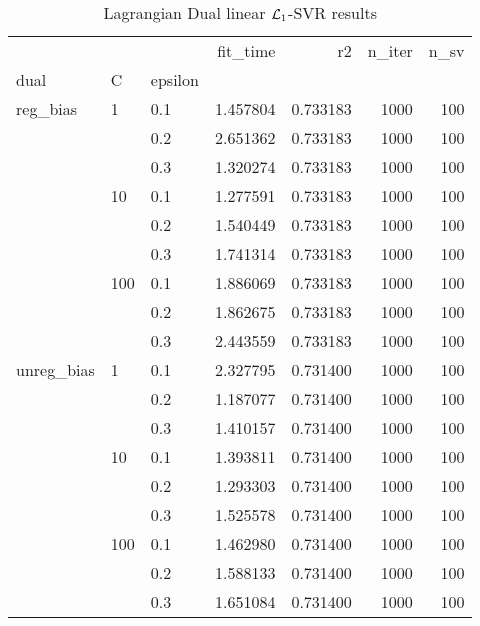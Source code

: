 \begin{table}[H]
\centering
\caption{Lagrangian Dual linear $\protect \mathcal{L}_1$-SVR results}
\label{linear_lagrangian_dual_l1_svr_cv_results}
\begin{tabular}{lllrrrr}
\toprule
           &     &     &  fit\_time &        r2 &  n\_iter &  n\_sv \\
dual & C & epsilon &           &           &         &       \\
\midrule
reg\_bias & 1   & 0.1 &  1.457804 &  0.733183 &    1000 &   100 \\
           &     & 0.2 &  2.651362 &  0.733183 &    1000 &   100 \\
           &     & 0.3 &  1.320274 &  0.733183 &    1000 &   100 \\
           & 10  & 0.1 &  1.277591 &  0.733183 &    1000 &   100 \\
           &     & 0.2 &  1.540449 &  0.733183 &    1000 &   100 \\
           &     & 0.3 &  1.741314 &  0.733183 &    1000 &   100 \\
           & 100 & 0.1 &  1.886069 &  0.733183 &    1000 &   100 \\
           &     & 0.2 &  1.862675 &  0.733183 &    1000 &   100 \\
           &     & 0.3 &  2.443559 &  0.733183 &    1000 &   100 \\
unreg\_bias & 1   & 0.1 &  2.327795 &  0.731400 &    1000 &   100 \\
           &     & 0.2 &  1.187077 &  0.731400 &    1000 &   100 \\
           &     & 0.3 &  1.410157 &  0.731400 &    1000 &   100 \\
           & 10  & 0.1 &  1.393811 &  0.731400 &    1000 &   100 \\
           &     & 0.2 &  1.293303 &  0.731400 &    1000 &   100 \\
           &     & 0.3 &  1.525578 &  0.731400 &    1000 &   100 \\
           & 100 & 0.1 &  1.462980 &  0.731400 &    1000 &   100 \\
           &     & 0.2 &  1.588133 &  0.731400 &    1000 &   100 \\
           &     & 0.3 &  1.651084 &  0.731400 &    1000 &   100 \\
\bottomrule
\end{tabular}
\end{table}
